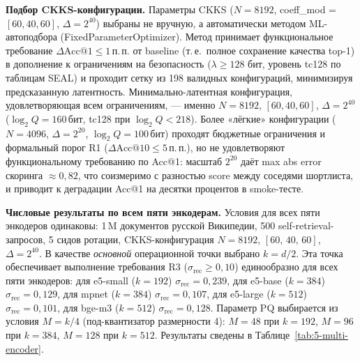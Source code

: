 \documentclass[a4paper, 12pt, oneside, openany]{article}
\begin{document}
\textbf{Подбор CKKS-конфигурации.} Параметры CKKS ($N = 8192$, coeff\_mod = $[60, 40, 60]$, $\Delta = 2^{40}$) выбраны не вручную, а автоматически методом ML-автоподбора (FixedParameterOptimizer). Метод принимает функциональное требование $\Delta\mathrm{Acc@1} \leq 1$\,п.\,п. от baseline (т.\,е.\ полное сохранение качества top-1) в дополнение к ограничениям на безопасность ($\lambda \geq 128$ бит, уровень tc128 по таблицам SEAL) и проходит сетку из 198 валидных конфигураций, минимизируя предсказанную латентность. Минимально-латентная конфигурация, удовлетворяющая всем ограничениям, --- именно $N = 8192$, $[60, 40, 60]$, $\Delta = 2^{40}$ ($\log_{2} Q = 160$\,бит, tc128 при $\log_{2} Q < 218$). Более «лёгкие» конфигурации ($N = 4096$, $\Delta = 2^{20}$, $\log_{2} Q = 100$\,бит) проходят бюджетные ограничения и формальный порог R1 ($\Delta\mathrm{Acc@10} \leq 5$\,п.\,п.), но не удовлетворяют функциональному требованию по Acc@1: масштаб $2^{20}$ даёт max abs error скоринга $\approx 0{,}82$, что соизмеримо с разностью score между соседями шортлиста, и приводит к деградации Acc@1 на десятки процентов в smoke-тесте. 




\medskip

\textbf{Числовые результаты по всем пяти энкодерам.} Условия для всех пяти энкодеров одинаковы: 1\,M документов русской Википедии, 500 self-retrieval-запросов, 5 сидов ротации, CKKS-конфигурация $N = 8192$, $[60,\,40,\,60]$, $\Delta = 2^{40}$. В качестве \emph{основной} операционной точки выбрано $k = d/2$. Эта точка обеспечивает выполнение требования R3 ($\sigma_{\mathrm{rec}} \geq 0{,}10$) единообразно для всех пяти энкодеров: для e5-small ($k = 192$) $\sigma_{\mathrm{rec}} = 0{,}239$, для e5-base ($k = 384$) $\sigma_{\mathrm{rec}} = 0{,}129$, для mpnet ($k = 384$) $\sigma_{\mathrm{rec}} = 0{,}107$, для e5-large ($k = 512$) $\sigma_{\mathrm{rec}} = 0{,}101$, для bge-m3 ($k = 512$) $\sigma_{\mathrm{rec}} = 0{,}128$. Параметр PQ выбирается из условия $M = k/4$ (под-квантизатор размерности 4): $M = 48$ при $k = 192$, $M = 96$ при $k = 384$, $M = 128$ при $k = 512$. Результаты сведены в Таблице~\ref{tab:5-multi-encoder}. 
\end{document}
